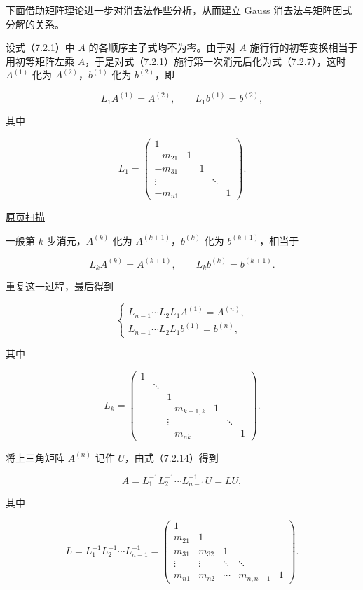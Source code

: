 \documentclass[
  10pt,
  fontset=fandol]{ctexart}
\begin{document}
下面借助矩阵理论进一步对消去法作些分析，从而建立 Gauss 消去法与矩阵因式分解的关系。

设式（7.2.1）中 \(A\) 的各顺序主子式均不为零。由于对 \(A\) 施行行的初等变换相当于用初等矩阵左乘 \(A\)，于是对式（7.2.1）施行第一次消元后化为式（7.2.7），这时 \(A^{(1)}\) 化为 \(A^{(2)}\)，\(b^{(1)}\) 化为 \(b^{(2)}\)，即

\[L_1A^{(1)}=A^{(2)},\qquad L_1b^{(1)}=b^{(2)},\]

其中

\[
L_1=\begin{pmatrix}
1&&&&\\
-m_{21}&1&&&\\
-m_{31}&&1&&\\
\vdots&&&\ddots&\\
-m_{n1}&&&&1
\end{pmatrix}.
\]

\href{../../source-images/pdf-182.jpeg}{原页扫描}

一般第 \(k\) 步消元，\(A^{(k)}\) 化为 \(A^{(k+1)}\)，\(b^{(k)}\) 化为 \(b^{(k+1)}\)，相当于

\[L_kA^{(k)}=A^{(k+1)},\qquad L_kb^{(k)}=b^{(k+1)}.\]

重复这一过程，最后得到

\[
\begin{cases}
L_{n-1}\cdots L_2L_1A^{(1)}=A^{(n)},\\
L_{n-1}\cdots L_2L_1b^{(1)}=b^{(n)},
\end{cases}
\tag{7.2.14}
\]

其中

\[
L_k=\begin{pmatrix}
1&&&&&\\
&\ddots&&&&\\
&&1&&&\\
&&-m_{k+1,k}&1&&\\
&&\vdots&&\ddots&\\
&&-m_{nk}&&&1
\end{pmatrix}.
\]

将上三角矩阵 \(A^{(n)}\) 记作 \(U\)，由式（7.2.14）得到

\[A=L_1^{-1}L_2^{-1}\cdots L_{n-1}^{-1}U=LU,\]

其中

\[
L=L_1^{-1}L_2^{-1}\cdots L_{n-1}^{-1}
=\begin{pmatrix}
1&&&&\\
m_{21}&1&&&\\
m_{31}&m_{32}&1&&\\
\vdots&\vdots&\ddots&\ddots&\\
m_{n1}&m_{n2}&\cdots&m_{n,n-1}&1
\end{pmatrix}.
\]
\end{document}
